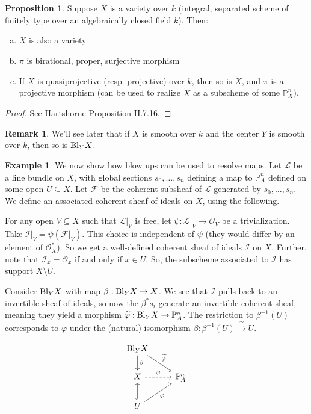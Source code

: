 \documentclass[10pt,reqno]{amsart}
\theoremstyle{definition}
\newtheorem{example}[theorem]{Example}
\newtheorem{proposition}[theorem]{Proposition}
\newtheorem{remark}[theorem]{Remark}
\theoremstyle{remark}
\numberwithin{equation}{section}
\numberwithin{theorem}{section}
\newcommand{\OO}{{\mathcal O}}
\newcommand{\FF}{{\mathscr F}}
\newcommand{\LL}{{\mathscr L}}
\newcommand{\II}{{\mathscr I}}
\newcommand{\wt}{\widetilde}
\newcommand{\Bl}{\textup{Bl}}
\newcommand{\PP}{{\mathbb P}}
\begin{document}
\begin{proposition} Suppose $X$ is a variety over $k$ (integral, separated scheme of finitely type over an algebraically closed field $k$). Then:
\begin{enumerate}[(a)]
\item $\wt{X}$ is also a variety
\item $\pi$ is birational, proper, surjective morphism
\item If $X$ is quasiprojective (resp. projective) over $k$, then so is $\wt{X}$, and $\pi$ is a projective morphism (can be used to realize $\wt{X}$ as a subscheme of some $\PP^n_X$).
\end{enumerate}
\end{proposition}
\begin{proof} See Hartshorne Proposition II.7.16.
\end{proof}


\begin{remark} We'll see later that if $X$ is smooth over $k$ and the center $Y$ is smooth over $k$, then so is $\Bl_Y X$.
\end{remark}

\begin{example} We now show how blow ups can be used to resolve maps. Let $\LL$ be a line bundle on $X$, with global sections $s_0, \dots, s_n$ defining a map to $\PP^n_A$ defined on some open $U \subseteq X$. Let $\FF$ be the coherent subsheaf of $\LL$ generated by $s_0,\dots,s_n$. We define an associated coherent sheaf of ideals on $X$, using the following.

For any open $V \subseteq X$ such that $\LL|_{V}$ is free, let $\psi: \LL|_{V} \to \OO_V$ be a trivialization. Take $\II|_{V} = \psi(\FF|_V)$. This choice is independent of $\psi$ (they would differ by an element of $\OO_X^*$). So we get a well-defined coherent sheaf of ideals $\II$ on $X$. Further, note that $\II_x = \OO_x$ if and only if $x \in U$. So, the subscheme associated to $\II$ has support $X \setminus U$.

Consider $\Bl_Y X$ with map $\beta: \Bl_Y X \to X$. We see that $\II$ pulls back to an invertible sheaf of ideals, so now the $\beta^* s_i$ generate an \underline{invertible} coherent sheaf, meaning they yield a morphism $\wt{\varphi}: \Bl_Y X \to \PP^n_A$. The restriction to $\beta^{-1}(U)$ corresponds to $\varphi$ under the (natural) isomorphism $\beta: \beta^{-1}(U) \stackrel{\cong}{\to} U$.


\[
\begin{tikzcd}
\Bl_Y X \arrow[dr, "\wt{\varphi}"] \arrow[d, "\beta"]& \\
X \arrow[r,dashed, "\varphi"]& \PP^n_A\\
U \arrow[u, hook] \arrow[ur, swap, "\varphi"]& 
\end{tikzcd}
\]
\end{example}
\end{document}
